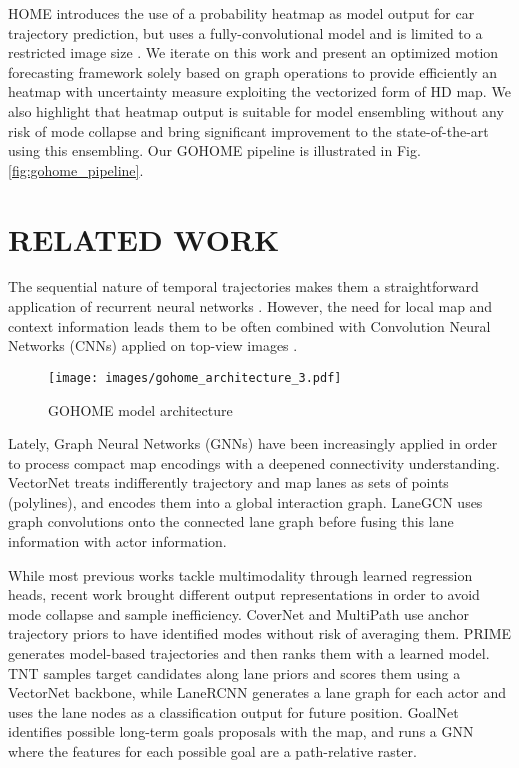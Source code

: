 \documentclass[letterpaper, 10 pt, conference]{ieeeconf}
\begin{document}
    HOME \cite{gilles2021home} introduces the use of a probability heatmap as model output for car trajectory prediction, but uses a fully-convolutional model and is limited to a restricted image size . We iterate on this work and present an optimized motion forecasting framework solely based on graph operations to provide efficiently an heatmap with uncertainty measure exploiting the vectorized form of HD map. We also highlight that heatmap output is suitable for model ensembling without any risk of mode collapse and bring significant improvement to the state-of-the-art using this ensembling.
    Our GOHOME pipeline is illustrated in Fig. \ref{fig:gohome_pipeline}.
    




\section{RELATED WORK}

\label{sec:citations}

The sequential nature of temporal trajectories makes them a straightforward application of recurrent neural networks \cite{altche2017lstm, mercat2020multi}. However, the need for local map and context information leads them to be often combined with Convolution Neural Networks (CNNs) applied on top-view images \cite{lee2017desire, tang2019multiple, cui2019multimodal, liu2021multimodal}.



\begin{figure*}[b]
\centerline{\texttt{[image: images/gohome\_architecture\_3.pdf]}}
\caption{GOHOME model architecture}
\label{fig:gohome_architecture}
\end{figure*}

Lately, Graph Neural Networks (GNNs) have been increasingly applied in order to process compact map encodings with a deepened connectivity understanding. VectorNet \cite{gao2020vectornet} treats indifferently trajectory and map lanes as sets of points (polylines), and encodes them into a global interaction graph. LaneGCN \cite{liang2020learning} uses graph convolutions onto the connected lane graph before fusing this lane information with actor information. 

While most previous works tackle multimodality through learned regression heads, recent work brought different output representations in order to avoid mode collapse and sample inefficiency. CoverNet \cite{phan2020covernet} and MultiPath \cite{chai2020multipath} use anchor trajectory priors to have identified modes without risk of averaging them. PRIME \cite{song2021learning} generates model-based trajectories and then ranks them with a learned model. TNT \cite{zhao2020tnt} samples target candidates along lane priors and scores them using a VectorNet backbone, while LaneRCNN \cite{zeng2021lanercnn} generates a lane graph for each actor and uses the lane nodes as a classification output for future position. GoalNet \cite{zhang2020map} identifies possible long-term goals proposals with the map, and runs a GNN where the features for each possible goal are a path-relative raster.
\end{document}
